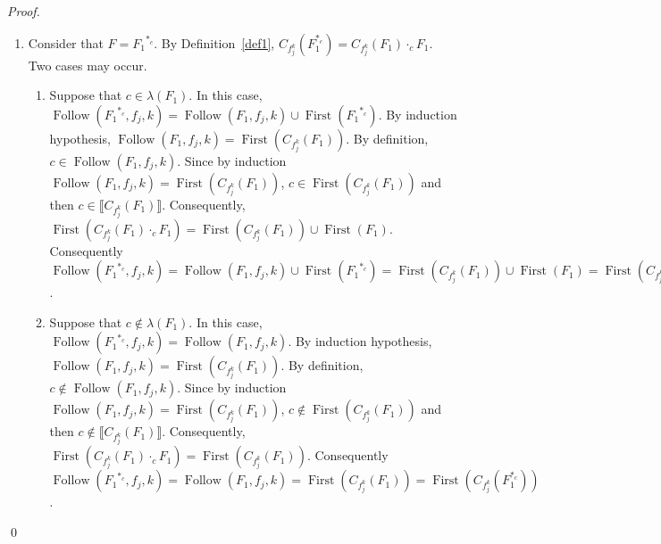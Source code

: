 \documentclass{llncs}
\DeclareMathOperator{\First}{First}
\DeclareMathOperator{\Follow}{Follow}
\begin{document}
\begin{proof}
\begin{enumerate}
\begin{enumerate}
      \end{enumerate}
\item Consider that $F={F_1}^{*_c}$. By Definition~\ref{def1}, $C_{f^k_j}(F_1^{*_c})=C_{f^k_j}(F_1)\cdot_c F_1$. Two cases may occur.
     \begin{enumerate}
       \item Suppose that $c\in \lambda(F_1)$. In this case, $\Follow({F_1}^{*_c},f_j,k)=\Follow(F_1,f_j,k) \cup \First({F_1}^{*_c})$. By induction hypothesis, $\Follow(F_1,f_j,k)=\First(C_{f^k_j}(F_1))$. By definition, $c\in \Follow(F_1,f_j,k)$. Since by induction $\Follow(F_1,f_j,k)=\First(C_{f^k_j}(F_1))$, $c\in \First(C_{f^k_j}(F_1))$ and then $c\in \llbracket C_{f^k_j}(F_1) \rrbracket$. Consequently, $\First(C_{f^k_j}(F_1)\cdot_c F_1)=\First(C_{f^k_j}(F_1)) \cup \First(F_1)$. Consequently $\Follow({F_1}^{*_c},f_j,k)=\Follow(F_1,f_j,k)\cup \First({F_1}^{*_c})=\First(C_{f^k_j}(F_1))\cup  \First(F_1)=\First(C_{f^k_j}(F_1^{*_c}))$.
       \item Suppose that $c\notin \lambda(F_1)$. In this case, $\Follow({F_1}^{*_c},f_j,k)=\Follow(F_1,f_j,k)$. By induction hypothesis, $\Follow(F_1,f_j,k)=\First(C_{f^k_j}(F_1))$. By definition, $c\notin \Follow(F_1,f_j,k)$. Since by induction $\Follow(F_1,f_j,k)=\First(C_{f^k_j}(F_1))$, $c\notin \First(C_{f^k_j}(F_1))$ and then $c\notin \llbracket C_{f^k_j}(F_1) \rrbracket$. Consequently, $\First(C_{f^k_j}(F_1)\cdot_c F_1)=\First(C_{f^k_j}(F_1))$. Consequently $\Follow({F_1}^{*_c},f_j,k)=\Follow(F_1,f_j,k)=\First(C_{f^k_j}(F_1))=\First(C_{f^k_j}(F_1^{*_c}))$.
     \end{enumerate}
  \end{enumerate}
  \qed
 \end{proof}
\end{document}
